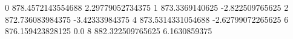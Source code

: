 0 878.4572143554688 2.29779052734375
1 873.3369140625 -2.822509765625
2 872.736083984375 -3.42333984375
4 873.5314331054688 -2.62799072265625
6 876.159423828125 0.0
8 882.322509765625 6.1630859375
